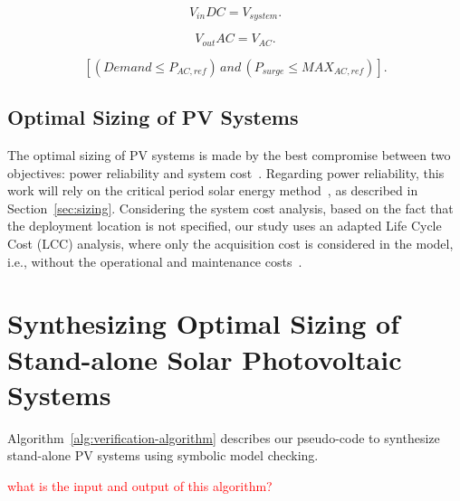 \documentclass[runningheads]{llncs}
\begin{document}
\begin{equation}
\label{eq:vindc} 
V_{in}DC = V_{system}.
\end{equation}

\begin{equation}
\label{eq:voutac} 
V_{out}AC = V_{AC}.
\end{equation}

\begin{equation}
\label{eq:invcheck} 
\left[ (Demand \leq P_{AC,ref}) \, and \, (P_{surge} \leq MAX_{AC,ref}) \right].
\end{equation}

\subsection{Optimal Sizing of PV Systems}
%
The optimal sizing of PV systems is made by the best compromise between two objectives: power reliability and system cost~\cite{Alsadi2018}. 
Regarding power reliability, this work will rely on the critical period solar energy method~\cite{Pinho}, as described in Section~\ref{sec:sizing}. 
Considering the system cost analysis, based on the fact that the deployment location is not specified, our study uses an adapted Life Cycle Cost (LCC) analysis, where only the acquisition cost is considered in the model, i.e., without the operational and maintenance costs~\cite{Alsadi2018}.

\section{Synthesizing Optimal Sizing of Stand-alone Solar Photovoltaic Systems}
Algorithm~\ref{alg:verification-algorithm} describes our pseudo-code to synthesize stand-alone PV systems using symbolic model checking. 

\textcolor{red}{what is the input and output of this algorithm?}
\end{document}
